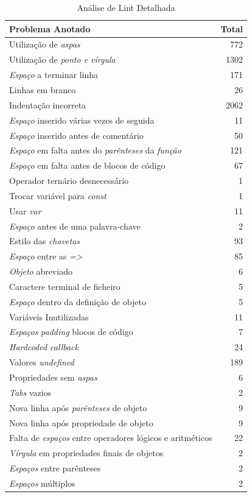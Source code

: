 \documentclass[a4paper,12pt]{article} %
\begin{document}
\vspace{1cm}
\begin{table}[!ht]
	\centering
	\begin{tabular}{|l|r|}
		\hline
		\textbf{Problema Anotado} & \textbf{Total} \\
		\hline
		Utilização de \textit{aspas} & 772 \\
		\hline
		Utilização de \textit{ponto e vírgula} & 1302 \\
		\hline
		\textit{Espaço} a terminar linha & 171 \\
		\hline
		Linhas em branco & 26 \\
		\hline
		Indentação incorreta & 2062 \\
		\hline
		\textit{Espaço} inserido várias vezes de seguida & 11 \\
		\hline
		\textit{Espaço} inserido antes de comentário & 50 \\
		\hline
		\textit{Espaço} em falta antes do \textit{parênteses} da \textit{função} & 121 \\
		\hline
		\textit{Espaço} em falta antes de blocos de código & 67 \\
		\hline
		Operador ternário desnecessário & 1 \\
		\hline
		Trocar variável para \textit{const} & 1 \\
		\hline
		Usar \textit{var} & 11 \\
		\hline
		\textit{Espaço} antes de uma palavra-chave & 2 \\
		\hline
		Estilo das \textit{chavetas} & 93 \\
		\hline
		\textit{Espaço} entre as \textit{=>} & 85 \\
		\hline
		\textit{Objeto} abreviado & 6 \\
		\hline
		Caractere terminal de ficheiro & 5 \\
		\hline
		\textit{Espaço} dentro da definição de objeto & 5 \\
		\hline
		Variáveis Inutilizadas & 11 \\
		\hline
		\textit{Espaços} \textit{padding} blocos de código & 7 \\
		\hline
		\textit{Hardcoded callback} & 24 \\
		\hline
		Valores \textit{undefined} & 189 \\
		\hline
		Propriedades sem \textit{aspas} & 6 \\
		\hline
		\textit{Tabs} vazios & 2 \\
		\hline
		Nova linha após \textit{parênteses} de objeto & 9 \\
		\hline
		Nova linha após propriedade de objeto & 9 \\
		\hline
		Falta de \textit{espaços} entre operadores lógicos e aritméticos & 22 \\
		\hline
		\textit{Vírgula} em propriedades finais de objetos & 2 \\
		\hline
		\textit{Espaços} entre parênteses & 2 \\
		\hline
		\textit{Espaços} múltiplos & 2 \\
		\hline
	\end{tabular}
	\caption{Análise de Lint Detalhada}
\end{table}
\end{document}
